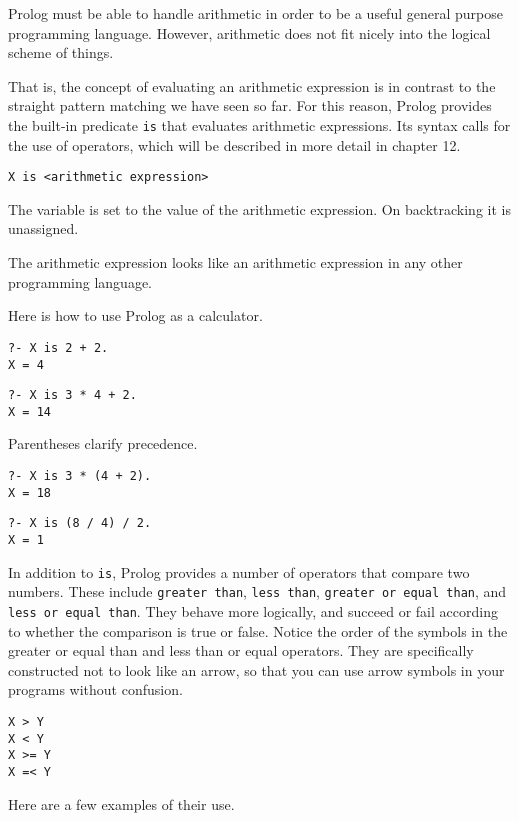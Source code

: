 \secdown

Prolog must be able to handle arithmetic in order to be a useful general purpose
programming language. However, arithmetic does not fit nicely into the logical
scheme of things.

That is, the concept of evaluating an arithmetic expression is in contrast to
the straight pattern matching we have seen so far. For this reason, Prolog
provides the built-in predicate \verb'is' that evaluates arithmetic expressions.
Its syntax calls for the use of operators, which will be described in more
detail in chapter 12.

\begin{verbatim}
X is <arithmetic expression>
\end{verbatim}
The variable  is set to the value of the arithmetic expression. On
backtracking it is unassigned.

The arithmetic expression looks like an arithmetic expression in any other
programming language.

Here is how to use Prolog as a calculator.

\begin{verbatim}
?- X is 2 + 2.
X = 4
\end{verbatim}

\begin{verbatim}
?- X is 3 * 4 + 2.
X = 14
\end{verbatim}
Parentheses clarify precedence.

\begin{verbatim}
?- X is 3 * (4 + 2).
X = 18
\end{verbatim}

\begin{verbatim}
?- X is (8 / 4) / 2.
X = 1
\end{verbatim}
In addition to \verb'is', Prolog provides a number of operators that compare two
numbers. These include \verb'greater than', \verb'less than',
\verb'greater or equal than', and \verb'less or equal than'. They behave more
logically, and succeed or fail according to whether the comparison is true or
false. Notice the order of the symbols in the greater or equal than and less
than or equal operators. They are specifically constructed not to look like an
arrow, so that you can use arrow symbols in your programs without confusion.

\begin{verbatim}
X > Y
X < Y
X >= Y
X =< Y
\end{verbatim}
Here are a few examples of their use.

